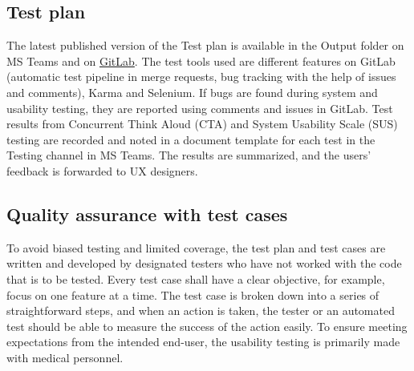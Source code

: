 \subsection{Test plan}
The latest published version of the Test plan is available in the Output folder on MS Teams and on \href{https://gitlab.liu.se/tddc88-company-1-2021/deploy/-/tree/main/documents/Test\%20Plan}{GitLab}. The test tools used are different features on GitLab (automatic test pipeline in merge requests, bug tracking with the help of issues and comments), Karma and Selenium. If bugs are found during system and usability testing, they are reported using comments and issues in GitLab. Test results from Concurrent Think Aloud (CTA) and System Usability Scale (SUS) testing are recorded and noted in a document template for each test in the Testing channel in MS Teams. The results are summarized, and the users' feedback is forwarded to UX designers.  


\subsection{Quality assurance with test cases}
To avoid biased testing and limited coverage, the test plan and test cases are written and developed by designated testers who have not worked with the code that is to be tested. Every test case shall have a clear objective, for example, focus on one feature at a time. The test case is broken down into a series of straightforward steps, and when an action is taken, the tester or an automated test should be able to measure the success of the action easily. To ensure meeting expectations from the intended end-user, the usability testing is primarily made with medical personnel.

